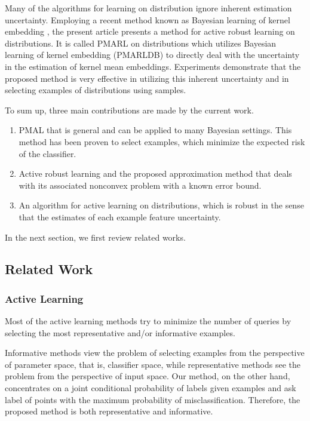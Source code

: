 \documentclass[10pt,twocolumn]{IEEEtran}
\begin{document}
	Many of the algorithms for learning on distribution ignore inherent estimation uncertainty. Employing a recent method known as Bayesian learning of kernel embedding \cite{flaxman2016bayesian}, the present article presents a method for active robust learning on distributions. It is called PMARL on distributions which utilizes Bayesian learning of kernel embedding (PMARLDB) to directly deal with the uncertainty in the estimation of kernel mean embeddings. Experiments demonstrate that the proposed method is very effective in utilizing this inherent uncertainty and in selecting examples of distributions using samples.
	
	To sum up, three main contributions are made by the current work.
	\begin{enumerate}
		\item PMAL that is general and can be applied to many Bayesian settings. This method has been proven to select examples, which minimize the expected risk of the classifier.
		\item Active robust learning and the proposed approximation method that deals with its associated nonconvex problem with a known error bound.
		\item An algorithm for active learning on distributions, which is robust in the sense that the estimates of each example feature uncertainty.
	\end{enumerate}
	
	In the next section, we first review related works.
	
	\subsection{Related Work}
	
	\subsubsection{Active Learning}
	Most of the active learning methods try to minimize the number of queries by selecting the most representative and/or informative examples.
	
	Informative methods view the problem of selecting examples from the perspective of parameter space, that is, classifier space, while representative methods see the problem from the perspective of input space. Our method, on the other hand, concentrates on a joint conditional probability of labels given examples and ask label of points with the maximum probability of misclassification. Therefore, the proposed method is both representative and informative.
	
\end{document}
